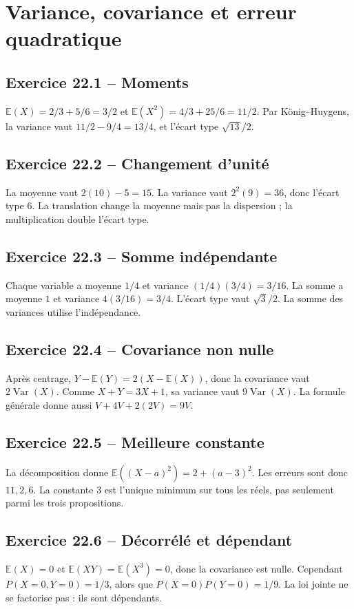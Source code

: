 \chapter{Variance, covariance et erreur quadratique}
\section*{Exercice 22.1 -- Moments}
$\mathbb E(X)=2/3+5/6=3/2$ et $\mathbb E(X^2)=4/3+25/6=11/2$. Par König--Huygens, la variance vaut $11/2-9/4=13/4$, et l'écart type $\sqrt{13}/2$.

\section*{Exercice 22.2 -- Changement d'unité}
La moyenne vaut $2(10)-5=15$. La variance vaut $2^2(9)=36$, donc l'écart type $6$. La translation change la moyenne mais pas la dispersion ; la multiplication double l'écart type.

\section*{Exercice 22.3 -- Somme indépendante}
Chaque variable a moyenne $1/4$ et variance $(1/4)(3/4)=3/16$. La somme a moyenne $1$ et variance $4(3/16)=3/4$. L'écart type vaut $\sqrt3/2$. La somme des variances utilise l'indépendance.

\section*{Exercice 22.4 -- Covariance non nulle}
Après centrage, $Y-\mathbb E(Y)=2(X-\mathbb E(X))$, donc la covariance vaut $2\operatorname{Var}(X)$. Comme $X+Y=3X+1$, sa variance vaut $9\operatorname{Var}(X)$. La formule générale donne aussi $V+4V+2(2V)=9V$.

\section*{Exercice 22.5 -- Meilleure constante}
La décomposition donne $\mathbb E((X-a)^2)=2+(a-3)^2$. Les erreurs sont donc $11,2,6$. La constante $3$ est l'unique minimum sur tous les réels, pas seulement parmi les trois propositions.

\section*{Exercice 22.6 -- Décorrélé et dépendant}
$\mathbb E(X)=0$ et $\mathbb E(XY)=\mathbb E(X^3)=0$, donc la covariance est nulle. Cependant $P(X=0,Y=0)=1/3$, alors que $P(X=0)P(Y=0)=1/9$. La loi jointe ne se factorise pas : ils sont dépendants.
